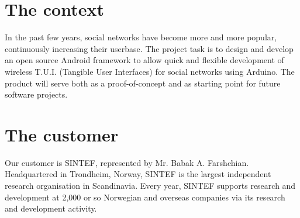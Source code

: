 \section{The context}
In the past few years, social networks have become more and more popular, continuously increasing their userbase.
The project task is to design and develop an open source Android framework to allow quick and flexible
development of wireless T.U.I. (Tangible User Interfaces) for social networks using Arduino.
The product will serve both as a proof-of-concept and as starting point for future software projects.
\section{The customer}
Our customer is SINTEF, represented by Mr. Babak A. Farshchian.
Headquartered in Trondheim, Norway, SINTEF is the largest independent research organisation in Scandinavia.
Every year, SINTEF supports research and development at 2,000 or so Norwegian and overseas
companies via its research and development activity.